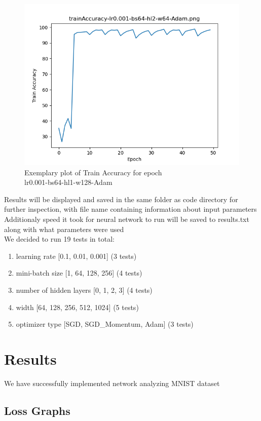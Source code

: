 \documentclass{article}[12pt]
\begin{document}
\begin{figure}[H]
\caption{Exemplary plot of Train Accuracy for epoch \\ lr0.001-bs64-hl1-w128-Adam }
\includegraphics[width=\textwidth]{testsResults/trainAccuracy/trainAccuracy-lr0.001-bs64-hl2-w64-Adam.png}
\centering
\end{figure}
Results will be displayed and saved in the same folder as code directory for further inspection, with file name containing information about input parameters \\
Additionaly speed it took for neural network to run will be saved to results.txt along with what parameters were used \\ 
We decided to run 19 tests in total:
\begin{enumerate} 
    \item learning rate [0.1, 0.01, 0.001] (3 tests)
    \item mini-batch size [1, 64, 128, 256] (4 tests)
    \item number of hidden layers [0, 1, 2, 3] (4 tests)
    \item width [64, 128, 256, 512, 1024] (5 tests)
    \item optimizer type [SGD, SGD\_Momentum, Adam] (3 tests)
\end{enumerate} 
\section{Results}
We have successfully implemented network analyzing MNIST dataset \\ 
\subsection{Loss Graphs}
\end{document}
